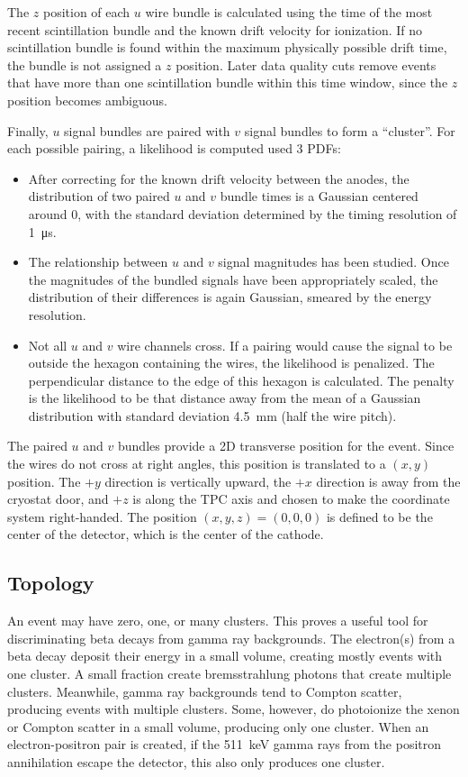 \documentclass[herrin-thesis.tex]{subfiles}
\begin{document}
The \(z\) position of each \(u\) wire bundle is calculated using the time of the most recent scintillation bundle and the known drift velocity for ionization. If no scintillation bundle is found within the maximum physically possible drift time, the bundle is not assigned a \(z\) position. Later data quality cuts remove events that have more than one scintillation bundle within this time window, since the \(z\) position becomes ambiguous.

Finally, \(u\) signal bundles are paired with \(v\) signal bundles to form a ``cluster''. For each possible pairing, a likelihood is computed used 3 PDFs:
\begin{itemize}
\item After correcting for the known drift velocity between the anodes, the distribution of two paired \(u\) and \(v\) bundle times is a Gaussian centered around 0, with the standard deviation determined by the timing resolution of \SI{1}{\micro\s}.
\item The relationship between \(u\) and \(v\) signal magnitudes has been studied. Once the magnitudes of the bundled signals have been appropriately scaled, the distribution of their differences is again Gaussian, smeared by the energy resolution.
\item Not all \(u\) and \(v\) wire channels cross. If a pairing would cause the signal to be outside the hexagon containing the wires, the likelihood is penalized. The perpendicular distance to the edge of this hexagon is calculated. The penalty is the likelihood to be that distance away from the mean of a Gaussian distribution with standard deviation \SI{4.5}{\mm} (half the wire pitch).
\end{itemize}

The paired \(u\) and \(v\) bundles provide a 2D transverse position for the event. Since the wires do not cross at right angles, this position is translated to a \((x, y)\) position. The \(+y\) direction is vertically upward, the \(+x\) direction is away from the cryostat door, and \(+z\) is along the TPC axis and chosen to make the coordinate system right-handed. The position \((x, y, z) = (0, 0, 0)\) is defined to be the center of the detector, which is the center of the cathode.

\subsection{Topology}
\label{sec:data_topology}
An event may have zero, one, or many clusters. This proves a useful tool for discriminating beta decays from gamma ray backgrounds. The electron(s) from a beta decay deposit their energy in a small volume, creating mostly events with one cluster. A small fraction create bremsstrahlung photons that create multiple clusters. Meanwhile, gamma ray backgrounds tend to Compton scatter, producing events with multiple clusters. Some, however, do photoionize the xenon or Compton scatter in a small volume, producing only one cluster. When an electron-positron pair is created, if the \SI{511}{\keV} gamma rays from the positron annihilation escape the detector, this also only produces one cluster.
\end{document}
